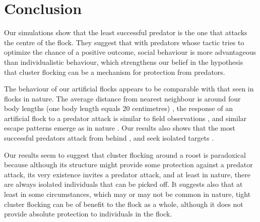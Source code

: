\section{Conclusion}

Our simulations show that the least successful predator is the one that attacks the centre of the flock. They suggest that with predators whose tactic tries to optimize the chance of a positive outcome, social behaviour is more advantageous than individualistic behaviour, which strengthens our belief in the hypothesis that cluster flocking can be a mechanism for protection from predators. 

The behaviour of our artificial flocks appears to be comparable with that seen in flocks in nature. The average distance from nearest neighbour is around four body lengths (one body length equals 20 centimetres) \cite{ballerini2008empirical,major1978three,pomeroy1992structure}, the response of an artificial flock to a predator attack is similar to field observations \cite{lee2006dynamics}, and similar escape patterns emerge as in nature \cite{pitcher1983predator}. Our results also shows that the most successful predators attack from behind \cite{handegard2012dynamics}, and seek isolated targets \cite{ioannou2012predatory}. 

Our results seem to suggest that cluster flocking around a roost is paradoxical because although its structure might provide some protection against a predator attack, its very existence invites a predator attack, and at least in nature, there are always isolated individuals that can be picked off. It suggests also that at least in some circumstances, which may or may not be common in nature, tight cluster flocking can be of benefit to the flock as a whole, although it does not provide absolute protection to individuals in the flock.


